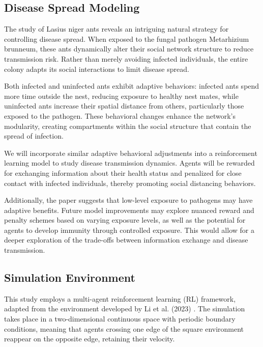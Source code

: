 \documentclass[9pt]{IEEEtran}
\begin{document}
\subsection{Disease Spread Modeling}

The study of Lasius niger ants \cite{Stroeymeyt2018} reveals an intriguing natural strategy for controlling disease spread. When exposed to the fungal pathogen Metarhizium brunneum, these ants dynamically alter their social network structure to reduce transmission risk. Rather than merely avoiding infected individuals, the entire colony adapts its social interactions to limit disease spread.

Both infected and uninfected ants exhibit adaptive behaviors: infected ants spend more time outside the nest, reducing exposure to healthy nest mates, while uninfected ants increase their spatial distance from others, particularly those exposed to the pathogen. These behavioral changes enhance the network’s modularity, creating compartments within the social structure that contain the spread of infection.

We will incorporate similar adaptive behavioral adjustments into a reinforcement learning model to study disease transmission dynamics. Agents will be rewarded for exchanging information about their health status and penalized for close contact with infected individuals, thereby promoting social distancing behaviors.

Additionally, the paper suggests that low-level exposure to pathogens may have adaptive benefits. Future model improvements may explore nuanced reward and penalty schemes based on varying exposure levels, as well as the potential for agents to develop immunity through controlled exposure. This would allow for a deeper exploration of the trade-offs between information exchange and disease transmission.

\subsection{Simulation Environment}

This study employs a multi-agent reinforcement learning (RL) framework, adapted from the environment developed by Li et al. (2023) \cite{li2023predator}. The simulation takes place in a two-dimensional continuous space with periodic boundary conditions, meaning that agents crossing one edge of the square environment reappear on the opposite edge, retaining their velocity.
\end{document}
